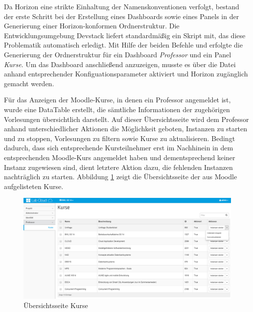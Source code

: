 Da Horizon eine strikte Einhaltung der Namenskonventionen verfolgt, bestand der erste Schritt bei der Erstellung eines Dashboards sowie eines Panels in der Generierung einer Horizon-konformen Ordnerstruktur. Die Entwicklungsumgebung Devstack liefert standardmäßig ein Skript mit, das diese Problematik automatisch erledigt. Mit Hilfe der beiden Befehle  und  erfolgte die Generierung der Ordnerstruktur für ein Dashboard \textit{Professor} und ein Panel \textit{Kurse}. Um das Dashboard anschließend anzuzeigen, musste es über die Datei  anhand entsprechender Konfiguationsparameter aktiviert und Horizon zugänglich gemacht werden.

Für das Anzeigen der Moodle-Kurse, in denen ein Professor angemeldet ist, wurde eine DataTable erstellt, die sämtliche Informationen der zugehörigen Vorlesungen übersichtlich darstellt. Auf dieser Übersichtsseite wird dem Professor anhand unterschiedlicher Aktionen die Möglichkeit geboten, Instanzen zu starten und zu stoppen, Vorlesungen zu filtern sowie Kurse zu aktualisieren. Bedingt dadurch, dass sich entsprechende Kursteilnehmer erst im Nachhinein in dem entsprechenden Moodle-Kurs angemeldet haben und dementsprechend keiner Instanz zugewiesen sind, dient letztere Aktion dazu, die fehlenden Instanzen nachträglich zu starten. Abbildung \ref{dashboard-courses} zeigt die Übersichtsseite der aus Moodle aufgelisteten Kurse.

\begin{figure}[H]
\centering
\includegraphics[scale=0.18]{img/dashboard-courses.png}
\caption{Übersichtsseite Kurse}
\label{dashboard-courses}
\end{figure}

